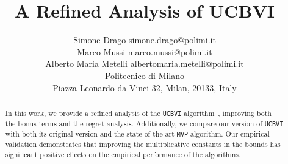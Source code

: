 \documentclass[twoside,11pt]{article}
\begin{document}
\title{A Refined Analysis of UCBVI}

\author{\name Simone Drago \email simone.drago@polimi.it \\
\name Marco Mussi \email marco.mussi@polimi.it \\
\name Alberto Maria Metelli \email albertomaria.metelli@polimi.it \\
\addr Politecnico di Milano \\
Piazza Leonardo da Vinci 32, Milan, 20133, Italy}


\maketitle

\begin{abstract}%
In this work, we provide a refined analysis of the \texttt{UCBVI} algorithm~\citep{azar2017minimax}, improving both the bonus terms and the regret analysis. Additionally, we compare our version of \texttt{UCBVI} with both its original version and the state-of-the-art \texttt{MVP} algorithm. Our empirical validation demonstrates that improving the multiplicative constants in the bounds has significant positive effects on the empirical performance of the algorithms. 
\end{abstract}








\clearpage
\vskip 0.2in


\clearpage
\appendix

\setlength{\parindent}{0pt}





\end{document}
